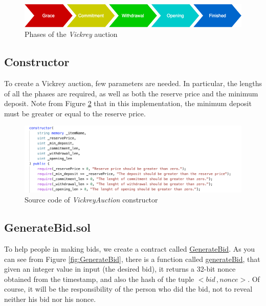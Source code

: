 \documentclass[runningheads,a4paper]{llncs}
\begin{document}
\begin{figure}[h]
\includegraphics[width=0.9\linewidth]{images/vickreyPhases.png}
\centering
\caption{Phases of the \emph{Vickrey} auction}
\label{fig:dutchConstructor}
\end{figure}


\subsection{Constructor}
To create a Vickrey auction, few parameters are needed. In particular, the lengths of all the phases are required, as well as both the reserve price and the minimum deposit. Note from Figure \ref{fig:vickreyConstructor} that in this implementation, the minimum deposit must be greater or equal to the reserve price.



\begin{figure}[h]
\includegraphics[width=\linewidth]{images/vickreyConstructor.png}
\centering
\caption{Source code of \emph{VickreyAuction} constructor}
\label{fig:vickreyConstructor}
\end{figure}


\newpage
\subsection{GenerateBid.sol}\label{genbid}
To help people in making bids, we create a contract called \url{GenerateBid}. As you can see from Figure \ref{fig:GenerateBid}, there is a function called \url{generateBid}, that given an integer value in input (the desired bid), it returns a 32-bit nonce obtained from the timestamp, and also the hash of the tuple \(<bid \, , nonce>\). Of course, it will be the responsibility of the person who did the bid, not to reveal neither his bid nor his nonce.
\end{document}
